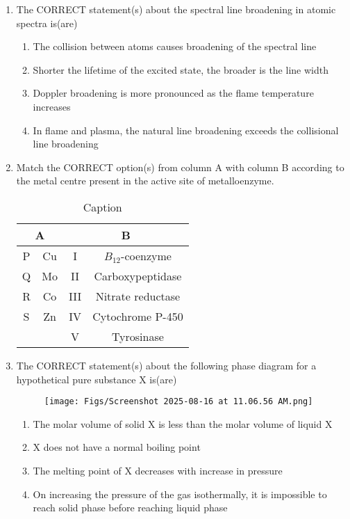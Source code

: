 \documentclass[12pt]{article}
\begin{document}
\begin{enumerate}
\begin{enumerate}
\end{enumerate}

\item The CORRECT statement(s) about the spectral line broadening in atomic spectra
is(are)

\begin{enumerate}
    \item The collision between atoms causes broadening of the spectral line
    \item Shorter the lifetime of the excited state, the broader is the line width
    \item Doppler broadening is more pronounced as the flame temperature increases
    \item In flame and plasma, the natural line broadening exceeds the collisional line
broadening
\end{enumerate}


\item Match the CORRECT option(s) from column A with column B according to the
metal centre present in the active site of metalloenzyme.


\begin{table}[H]
    \centering
    \begin{tabular}{|c|c|c|c|} \hline
         \multicolumn{2}{|c|}{\textbf{A}}&  \multicolumn{2}{|c|}{\textbf{B}}\\ \hline
         P&  Cu&  I& $B_{12}$-coenzyme\\ \hline
         Q&  Mo&  II& Carboxypeptidase\\ \hline
         R&  Co&  III& Nitrate reductase\\ \hline
         S&  Zn&  IV& Cytochrome P-450\\ \hline
         &  &  V& Tyrosinase\\ \hline
    \end{tabular}
    \caption{Caption}
    \label{tab:placeholder}
\end{table}

\item The CORRECT statement(s) about the following phase diagram for a hypothetical
pure substance X is(are)


\begin{figure}[H]
            \centering
            \texttt{[image: Figs/Screenshot 2025-08-16 at 11.06.56 AM.png]}
            \caption{}
            \end{figure}

\begin{enumerate}
    \item The molar volume of solid X is less than the molar volume of liquid X
    \item X does not have a normal boiling point
    \item The melting point of X decreases with increase in pressure
    \item On increasing the pressure of the gas isothermally, it is impossible to reach solid
phase before reaching liquid phase
\end{enumerate}


\end{enumerate}
\end{document}
